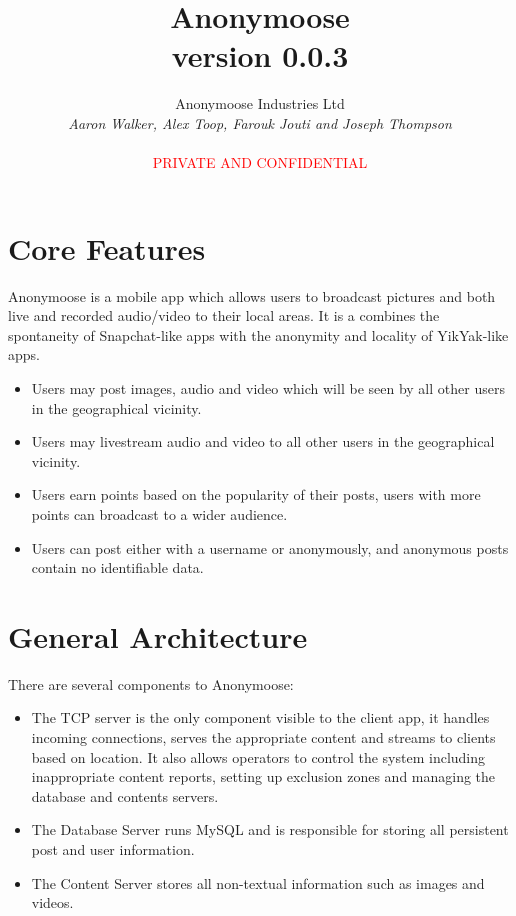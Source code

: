 \documentclass[12pt, a4paper]{article}
\begin{document}
\title{\textbf{Anonymoose \\ version 0.0.3}}
\author{Anonymoose Industries Ltd \\ \textit{Aaron Walker, Alex Toop, Farouk Jouti and Joseph Thompson} \\ \\ \textcolor{red}{PRIVATE AND CONFIDENTIAL}}
\date{}
\maketitle

\tableofcontents
\clearpage

\section{Core Features}
Anonymoose is a mobile app which allows users to broadcast pictures and both live and recorded audio/video to their local areas. It is a combines the spontaneity of Snapchat-like apps with the anonymity and locality of YikYak-like apps. 
\begin{itemize}
\item Users may post images, audio and video which will be seen by all other users in the geographical vicinity.
\item Users may livestream audio and video to all other users in the geographical vicinity.
\item Users earn points based on the popularity of their posts, users with more points can broadcast to a wider audience.
\item Users can post either with a username or anonymously, and anonymous posts contain no identifiable data.
\end{itemize} 
\clearpage
\section{General Architecture}
There are several components to Anonymoose:
\begin{itemize}
\item The TCP server is the only component visible to the client app, it handles incoming connections, serves the appropriate content and streams to clients based on location. It also allows operators to control the system including inappropriate content reports, setting up exclusion zones and managing the database and contents servers.
\item The Database Server runs MySQL and is responsible for storing all persistent post and user information.
\item The Content Server stores all non-textual information such as images and videos.
\end{itemize}
\end{document}
